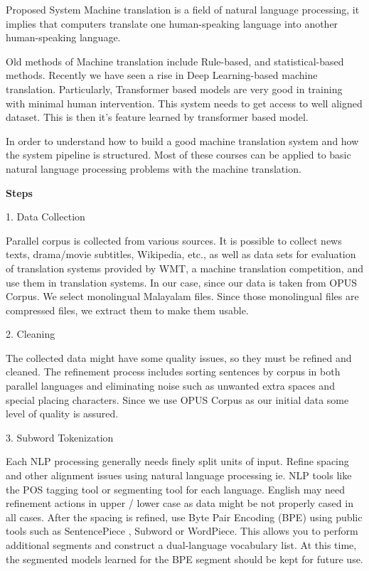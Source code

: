 \begin{chapter}{Proposed System}
    Machine translation is a field of natural language processing, it implies that computers translate one human-speaking language into another human-speaking language.

 Old methods of Machine translation include Rule-based, and statistical-based methods. Recently we have seen a rise in Deep Learning-based machine translation. Particularly, Transformer based models are very good in training with minimal human intervention. This system needs to get access to well aligned dataset. This is then it's feature learned by transformer based model.

In order to understand how to build a good machine translation system and how the system pipeline is structured. Most of these courses can be applied to basic natural language processing problems with the machine translation.

\textbf{Steps}

1. Data Collection

Parallel corpus is collected from various sources. It is possible to collect news texts, drama/movie subtitles, Wikipedia, etc., as well as data sets for evaluation of translation systems provided by WMT, a machine translation competition, and use them in translation systems. In our case, since our data is taken from OPUS Corpus. We select monolingual Malayalam files. Since those monolingual files are compressed files, we extract them to make them usable.

2. Cleaning

The collected data might have some quality issues, so they must be refined and cleaned. The refinement process includes sorting sentences by corpus in both parallel languages and eliminating noise such as unwanted extra spaces and special placing characters. Since we use OPUS Corpus as our initial data some level of quality is assured.

3. Subword Tokenization

Each NLP processing generally needs finely split units of input. Refine spacing and other alignment issues using natural language processing ie. NLP tools like the POS tagging tool or segmenting tool for each language. English may need refinement actions in  upper / lower case as data might be not properly cased in all cases. After the spacing is refined, use Byte Pair Encoding (BPE) using public tools such as SentencePiece , Subword or WordPiece. This allows you to perform additional segments and construct a dual-language vocabulary list. At this time, the segmented models learned for the BPE segment should be kept for future use.


\end{chapter}
